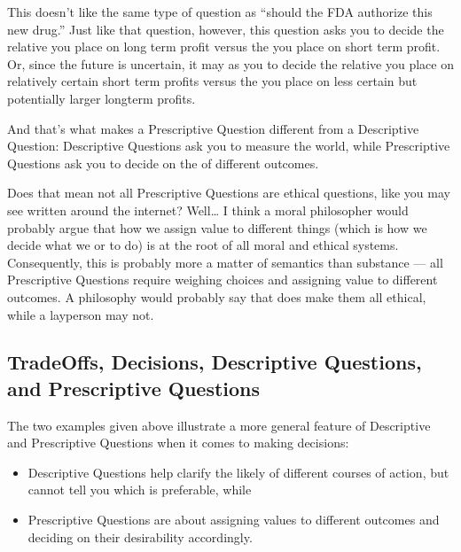 \documentclass[letterpaper,10pt,english]{jupyterBook}
\begin{document}
\sphinxAtStartPar
This doesn’t  like the same type of question as “should the FDA authorize this new drug.” Just like that question, however, this question asks you to decide the relative  you place on long term profit versus the  you place on short term profit. Or, since the future is uncertain, it may as you to decide the relative  you place on relatively certain short term profits versus the  you place on less certain but potentially larger long\sphinxhyphen{}term profits.

\sphinxAtStartPar
And that’s what makes a Prescriptive Question different from a Descriptive Question: Descriptive Questions ask you to measure the world, while Prescriptive Questions ask you to decide on the  of different outcomes.

\sphinxAtStartPar
Does that mean not all Prescriptive Questions are ethical questions, like you may see written around the internet? Well… I think a moral philosopher would probably argue that how we assign value to different things (which is how we decide what we  or  to do) is at the root of all moral and ethical systems. Consequently, this is probably more a matter of semantics than substance — all Prescriptive Questions require weighing choices and assigning value to different outcomes. A philosophy would probably say that does make them all ethical, while a layperson may not.


\subsection{Trade\sphinxhyphen{}Offs, Decisions, Descriptive Questions, and Prescriptive Questions}
\label{\detokenize{30_questions/05_descriptive_v_prescriptive:trade-offs-decisions-descriptive-questions-and-prescriptive-questions}}
\sphinxAtStartPar
The two examples given above illustrate a more general feature of Descriptive and Prescriptive Questions when it comes to making decisions:
\begin{itemize}
\item {} 
\sphinxAtStartPar
Descriptive Questions help clarify the likely  of different courses of action, but cannot tell you which is preferable, while

\item {} 
\sphinxAtStartPar
Prescriptive Questions are about assigning values to different outcomes and deciding on their desirability accordingly.

\end{itemize}
\end{document}

